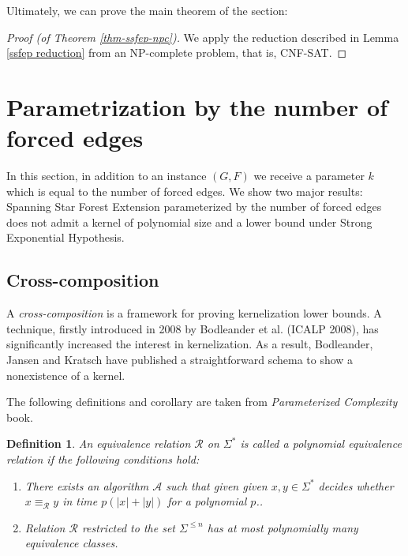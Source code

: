 \documentclass[en]{pracamgr}
\newtheorem{definition}{Definition}
\newcommand{\ssfep}{{\sc Spanning Star Forest Extension}}
\newcommand{\cnfsat}{{\sc CNF-SAT}}
\begin{document}
Ultimately, we can prove the main theorem of the section:

\begin{proof}[Proof (of Theorem \ref{thm-ssfep-npc})]
	We apply the reduction described in Lemma \ref{ssfep reduction} from an NP-complete problem, that is, \cnfsat{}.
\end{proof}

\section{Parametrization by the number of forced edges}

In this section, in addition to an instance $(G,F)$ we receive a parameter $k$ which is equal to the number of forced edges. We show two major results: \ssfep{} parameterized by the number of forced edges does not admit a kernel of polynomial size and a lower bound under Strong Exponential Hypothesis.

\subsection{Cross-composition}

A \emph{cross-composition} is a framework for proving kernelization lower bounds. A technique, firstly introduced in 2008 by Bodleander et al. (ICALP 2008), has significantly increased the interest in kernelization. As a result, Bodleander, Jansen and Kratsch have published a straightforward schema to show a nonexistence of a kernel.

The following definitions and corollary are taken from \textit{Parameterized Complexity} book. %

\begin{definition}\label{polynomial equivalence relation}
	An equivalence relation $\mathcal{R}$ on $\Sigma^*$ is called a \textup{polynomial equivalence relation} if the following conditions hold:
	\begin{enumerate}
		\item There exists an algorithm $\mathcal{A}$ such that given given $x,y \in \Sigma^*$ decides whether $x \equiv_{\mathcal{R}} y$ in time $p(|x|+|y|)$ for a polynomial $p$..
		\item Relation $\mathcal{R}$ restricted to the set $\Sigma^{\leq n}$ has at most polynomially many equivalence classes.
	\end{enumerate}
\end{definition}
\end{document}
